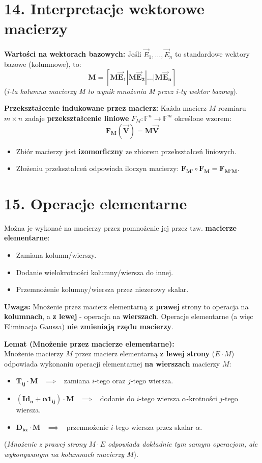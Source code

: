 \documentclass[12pt,a4paper]{article}
\begin{document}
\section*{14. Interpretacje wektorowe macierzy}
\noindent\textbf{Wartości na wektorach bazowych:} Jeśli $\vec{E}_1, \dots, \vec{E}_n$ to standardowe wektory bazowe (kolumnowe), to:
$$ \mathbf{M = [M\vec{E}_1 | M\vec{E}_2 | \dots | M\vec{E}_n]} $$
(\textit{i-ta kolumna macierzy M to wynik mnożenia M przez i-ty wektor bazowy}).

\noindent\textbf{Przekształcenie indukowane przez macierz:} Każda macierz $M$ rozmiaru $m \times n$ zadaje \textbf{przekształcenie liniowe} $F_M: \mathbb{F}^n \to \mathbb{F}^m$ określone wzorem:
$$ \mathbf{F_M(\vec{V}) = M\vec{V}} $$
\begin{itemize}
    \item Zbiór macierzy jest \textbf{izomorficzny} ze zbiorem przekształceń liniowych.
    \item Złożeniu przekształceń odpowiada iloczyn macierzy: $\mathbf{F_{M'} \circ F_M = F_{M'M}}$.
\end{itemize}

\section*{15. Operacje elementarne}
Można je wykonać na macierzy przez pomnożenie jej przez tzw. \textbf{macierze elementarne}:
\begin{itemize}
    \item Zamiana kolumn/wierszy.
    \item Dodanie wielokrotności kolumny/wiersza do innej.
    \item Przemnożenie kolumny/wiersza przez niezerowy skalar.
\end{itemize}
\noindent\textbf{Uwaga:} Mnożenie przez macierz elementarną \textbf{z prawej} strony to operacja na \textbf{kolumnach}, a \textbf{z lewej} - operacja na \textbf{wierszach}. Operacje elementarne (a więc Eliminacja Gaussa) \textbf{nie zmieniają rzędu macierzy}.

\noindent\textbf{Lemat (Mnożenie przez macierze elementarne):} \\
Mnożenie macierzy $M$ przez macierz elementarną \textbf{z lewej strony} ($E \cdot M$) odpowiada wykonaniu operacji elementarnej \textbf{na wierszach} macierzy $M$:
\begin{itemize}
    \item $\mathbf{T_{ij} \cdot M}$ \ $\implies$ \ zamiana $i$-tego oraz $j$-tego wiersza.
    \item $\mathbf{(Id_n + \alpha 1_{ij}) \cdot M}$ \ $\implies$ \ dodanie do $i$-tego wiersza $\alpha$-krotności $j$-tego wiersza.
    \item $\mathbf{D_{i\alpha} \cdot M}$ \ $\implies$ \ przemnożenie $i$-tego wiersza przez skalar $\alpha$.
\end{itemize}
(\textit{Mnożenie z prawej strony $M \cdot E$ odpowiada dokładnie tym samym operacjom, ale wykonywanym na kolumnach macierzy $M$}).
\end{document}
